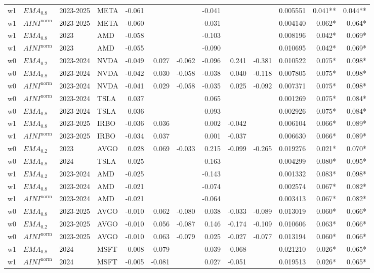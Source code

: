 \begin{tabular}{@{}llllrrrrrrrrr@{}}
w1 & $EMA_{0.8}$ & 2023-2025 & META & -0.061 &  &  & -0.041 &  &  & 0.005551 & 0.041** & 0.044** \\
w1 & $AINI^{\mathrm{norm}}$ & 2023-2025 & META & -0.060 &  &  & -0.031 &  &  & 0.004140 & 0.062* & 0.064* \\
w1 & $EMA_{0.8}$ & 2023 & AMD & -0.058 &  &  & -0.103 &  &  & 0.008196 & 0.042* & 0.069* \\
w1 & $AINI^{\mathrm{norm}}$ & 2023 & AMD & -0.055 &  &  & -0.090 &  &  & 0.010695 & 0.042* & 0.069* \\
w0 & $EMA_{0.2}$ & 2023-2024 & NVDA & -0.049 & 0.027 & -0.062 & -0.096 & 0.241 & -0.381 & 0.010522 & 0.075* & 0.098* \\
w0 & $EMA_{0.8}$ & 2023-2024 & NVDA & -0.042 & 0.030 & -0.058 & -0.038 & 0.040 & -0.118 & 0.007805 & 0.075* & 0.098* \\
w0 & $AINI^{\mathrm{norm}}$ & 2023-2024 & NVDA & -0.041 & 0.029 & -0.058 & -0.035 & 0.025 & -0.092 & 0.007371 & 0.075* & 0.098* \\
w0 & $AINI^{\mathrm{norm}}$ & 2023-2024 & TSLA & 0.037 &  &  & 0.065 &  &  & 0.001269 & 0.075* & 0.084* \\
w0 & $EMA_{0.8}$ & 2023-2024 & TSLA & 0.036 &  &  & 0.093 &  &  & 0.002926 & 0.075* & 0.084* \\
w1 & $EMA_{0.8}$ & 2023-2025 & IRBO & -0.036 & 0.036 &  & 0.002 & -0.042 &  & 0.006104 & 0.066* & 0.089* \\
w1 & $AINI^{\mathrm{norm}}$ & 2023-2025 & IRBO & -0.034 & 0.037 &  & 0.001 & -0.037 &  & 0.006630 & 0.066* & 0.089* \\
w0 & $EMA_{0.2}$ & 2023 & AVGO & 0.028 & 0.069 & -0.033 & 0.215 & -0.099 & -0.265 & 0.019276 & 0.021* & 0.070* \\
w0 & $EMA_{0.8}$ & 2024 & TSLA & 0.025 &  &  & 0.163 &  &  & 0.004299 & 0.080* & 0.095* \\
w1 & $EMA_{0.2}$ & 2023-2024 & AMD & -0.025 &  &  & -0.143 &  &  & 0.001332 & 0.083* & 0.098* \\
w1 & $EMA_{0.8}$ & 2023-2024 & AMD & -0.021 &  &  & -0.074 &  &  & 0.002574 & 0.067* & 0.082* \\
w1 & $AINI^{\mathrm{norm}}$ & 2023-2024 & AMD & -0.021 &  &  & -0.064 &  &  & 0.003413 & 0.067* & 0.082* \\
w0 & $EMA_{0.8}$ & 2023-2025 & AVGO & -0.010 & 0.062 & -0.080 & 0.038 & -0.033 & -0.089 & 0.013019 & 0.060* & 0.066* \\
w0 & $EMA_{0.2}$ & 2023-2025 & AVGO & -0.010 & 0.056 & -0.087 & 0.146 & -0.174 & -0.109 & 0.010606 & 0.063* & 0.066* \\
w0 & $AINI^{\mathrm{norm}}$ & 2023-2025 & AVGO & -0.010 & 0.063 & -0.079 & 0.025 & -0.027 & -0.077 & 0.013194 & 0.060* & 0.066* \\
w1 & $EMA_{0.8}$ & 2024 & MSFT & -0.008 & -0.079 &  & 0.039 & -0.068 &  & 0.021210 & 0.026* & 0.065* \\
w1 & $AINI^{\mathrm{norm}}$ & 2024 & MSFT & -0.005 & -0.081 &  & 0.027 & -0.051 &  & 0.019513 & 0.026* & 0.065* \\
\bottomrule
\end{tabular}
